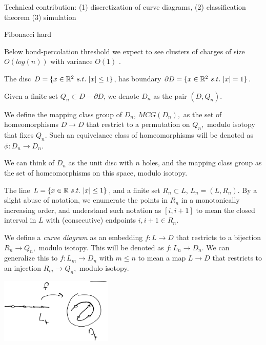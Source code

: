 \documentclass[12pt,a4paper]{article}
\begin{document}
Technical contribution: 
(1) discretization of curve diagrams,
(2) classification theorem
(3) simulation



Fibonacci hard

Below bond-percolation threshold we expect to see clusters
of charges of size $O(log(n))$ with variance $O(1)$ \cite{Bazant00}.



The disc $D = \{ x\in \mathR^2\ s.t.\ |x|\leq 1 \} $,
has boundary $\partial D = \{ x\in \mathbb{R}^2\ s.t.\ |x|=1 \} $.

Given a finite set $ Q_n \subset D-\partial D$,
we denote $D_n$ as the pair $(D, Q_n).$

We define the mapping class group of $D_n$,
$MCG(D_n),$ as the set of homeomorphisms $D\to D$ that
restrict to a permutation on $Q_n,$ modulo isotopy that
fixes $Q_n.$
Such an equivelance class
of homeomorphisms will be denoted as $\phi:D_n\to D_n.$

We can think of $D_n$ as the unit disc with $n$ holes,
and the mapping class group as the set of homeomorphisms on
this space, modulo isotopy.

The line $L = \{ x\in \mathbb{R}\ s.t.\ |x|\leq 1 \} $,
and a finite set $R_n\subset L$,
$L_n = (L, R_n).$
By a slight abuse of notation, we enumerate the points in $R_n$ 
in a monotonically increasing order,
and understand such notation as $[i, i+1]$ to mean the closed interval in $L$
with (consecutive) endpoints $i, i+1 \in R_n.$

We define a {\it curve diagram} as an embedding $f : L\to D$ that
restricts to a bijection $R_n\to Q_n,$ modulo
isotopy.
This will be denoted as $f : L_n\to D_n.$
We can generalize this to $f : L_m\to D_n$ with $m\leq n$
to mean a map $L\to D$ that restricts to an injection $R_m\to Q_n,$
modulo isotopy.

\begin{center}
\includegraphics[width=0.4\textwidth]{curve-diagram.eps}
\end{center}
\end{document}
